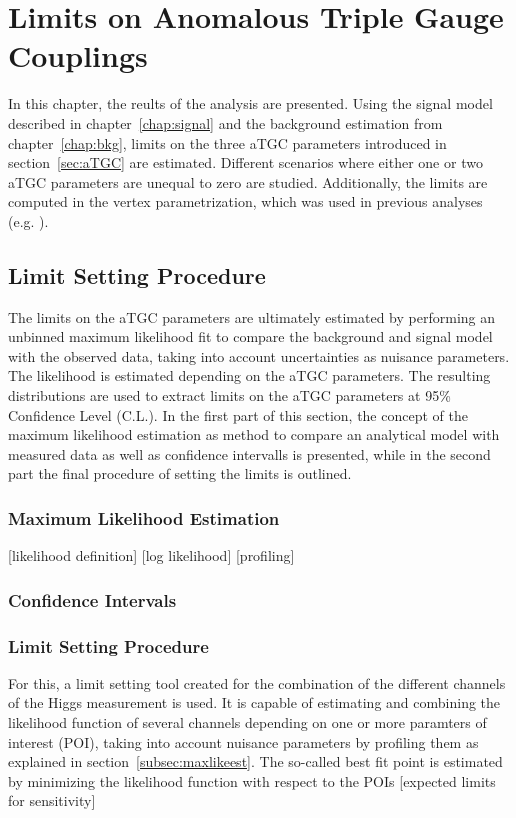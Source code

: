 \chapter{Limits on Anomalous Triple Gauge Couplings}
\label{chap:LimitsonATGCs}


In this chapter, the reults of the analysis are presented. Using the signal model described in chapter~\ref{chap:signal} and the background estimation from chapter~\ref{chap:bkg}, limits on the three aTGC parameters introduced in section~\ref{sec:aTGC} are estimated. Different scenarios where either one or two aTGC parameters are unequal to zero are studied. Additionally, the limits are computed in the vertex parametrization, which was used in previous analyses (e.g. \cite{aTGC1,aTGC2}).


\section{Limit Setting Procedure}
The limits on the aTGC parameters are ultimately estimated by performing an unbinned maximum likelihood fit to compare the background and signal model with the observed data, taking into account uncertainties as nuisance parameters. The likelihood is estimated depending on the aTGC parameters. The resulting distributions are used to extract limits on the aTGC parameters at 95\% Confidence Level (C.L.). In the first part of this section, the concept of the maximum likelihood estimation as method to compare an analytical model with measured data as well as confidence intervalls is presented, while in the second part the final procedure of setting the limits is outlined.
\subsection{Maximum Likelihood Estimation}
[likelihood definition]
[log likelihood]
[profiling]
\subsection{Confidence Intervals}
\subsection{Limit Setting Procedure}

For this, a limit setting tool \cite{combine} created for the combination of the different channels of the Higgs measurement \cite{higgs_comb} is used. It is capable of estimating and combining the likelihood function of several channels depending on one or more paramters of interest (POI), taking into account nuisance parameters by profiling them as explained in section~\ref{subsec:maxlikeest}. The so-called best fit point is estimated by minimizing the likelihood function with respect to the POIs
[expected limits for sensitivity]

